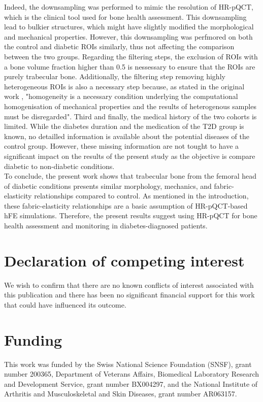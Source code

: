 \documentclass[a4paper,fleqn]{DC_ArtStyle}
\begin{document}
	Indeed, the downsampling was performed to mimic the resolution of HR-pQCT, which is the clinical tool used for bone health assessment.
	This downsampling lead to bulkier structures, which might have slightly modified the morphological and mechanical properties.
	However, this downsampling was perfmored on both the control and diabetic ROIs similarly, thus not affecting the comparison between the two groups.
	Regarding the filtering steps, the exclusion of ROIs with a bone volume fraction higher than 0.5 is nessessary to ensure that the ROIs are purely trabecular bone.
	Additionally, the filtering step removing highly heterogeneous ROIs is also a necessary step because, as stated in the original work \cite{Simon2022}, "homogeneity is a necessary condition underlying the computational homogenisation of mechanical properties and the results of heterogenous samples must be disregarded".
	Third and finally, the medical history of the two cohorts is limited.
	While the diabetes duration and the medication of the T2D group is known, no detailled information is available about the potential diseases of the control group.
	However, these missing information are not tought to have a significant impact on the results of the present study as the objective is compare diabetic to non-diabetic conditions.
	\\[0.5em]
	To conclude, the present work shows that trabecular bone from the femoral head of diabetic conditions presents similar morphology, mechanics, and fabric-elasticity relationships compared to control.
	As mentioned in the introduction, these fabric-elasticity relationships are a basic assumption of HR-pQCT-based hFE simulations.
	Therefore, the present results suggest using HR-pQCT for bone health assessment and monitoring in diabetes-diagnosed patients.

	
	\section*{Declaration of competing interest}
	We wish to confirm that there are no known conflicts of interest associated with this publication and there has been no significant financial support for this work that could have influenced its outcome.
	
	\section*{Funding}
	This work was funded by the Swiss National Science Foundation (SNSF), grant number 200365, Department of Veterans Affairs, Biomedical Laboratory Research and Development Service, grant number BX004297, and the National Institute of Arthritis and Musculoskeletal and Skin Diseases, grant number AR063157.
\end{document}

